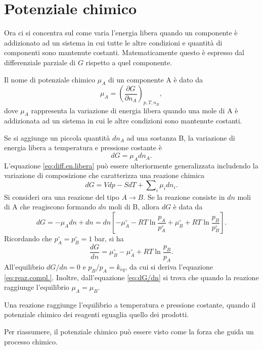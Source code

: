 \section{Potenziale chimico}
\label{sec: potenziale chimico}
Ora ci si concentra sul come varia l'energia libera quando un componente è addizionato ad un sistema in cui tutte le altre condizioni e quantità di componenti sono mantenute costanti. Matematicamente questo è espresso dal differenziale parziale di $G$ rispetto a quel componente.
\begin{defn}
    Il nome di potenziale chimico $\mu_A$ di un componente A è dato da
    \begin{equation}
    \mu_A=\left(\frac{\partial G}{\partial n_A}\right)_{p,T,n_B},
\end{equation}
dove $\mu_A$ rappresenta la variazione di energia libera quando una mole di A è addizionata ad un sistema in cui le altre condizioni sono mantenute costanti.
\end{defn}
Se si aggiunge un piccola quantità $dn_A$ ad una sostanza B, la variazione di energia libera a temperatura e pressione costante è
\begin{equation}
    dG=\mu_Adn_A.
\end{equation}
L'equazione \eqref{eq:diff.en.libera} può essere ulteriormente generalizzata includendo la variazione di composizione che caratterizza una reazione chimica
\begin{equation}
    dG=Vdp-SdT+\sum\nolimits_i\mu_idn_i.
\end{equation}
Si consideri ora una reazione del tipo $A\to B$. Se la reazione consiste in $dn$ moli di A che reagiscono formando $dn$ moli di B, allora $dG$ è data da
\begin{equation}
    dG=-\mu_Adn+dn=dn\left[-\mu_A^\circ-RT\ln{\frac{p_A}{p_A^\circ}}+\mu_B^\circ+RT\ln{\frac{p_B}{p_B^\circ}}\right].
\end{equation}
Ricordando che $p_A^\circ=p_B^\circ=1$ bar, si ha
\begin{equation}\label{eq:dG/dn}
    \frac{dG}{dn}=\mu_B^\circ-\mu_A^\circ+RT\ln{\frac{p_B}{p_A}}.
\end{equation}
All'equilibrio $dG/dn=0$ e $p_B/p_A=k_{eq}$, da cui si deriva l'equazione \eqref{eq:reaz.compl.}. Inoltre, dall'equazione \eqref{eq:dG/dn} si trova che quando la reazione raggiunge l'equilibrio $\mu_A=\mu_B$.
\begin{defn}
    Una reazione raggiunge l'equilibrio a temperatura e pressione costante, quando il potenziale chimico dei reagenti eguaglia quello dei prodotti.
\end{defn}
Per riassumere,  il potenziale chimico può essere visto come la forza che guida un processo chimico.

